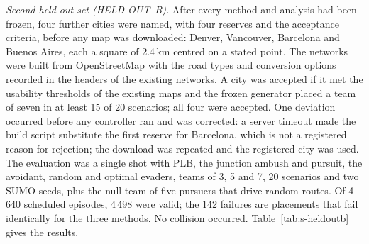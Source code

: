 \documentclass[preprint,12pt]{elsarticle}
\begin{document}
\emph{Second held-out set (HELD-OUT~B).} After every method and analysis had been frozen, four further cities were
named, with four reserves and the acceptance criteria, before any map was downloaded: Denver, Vancouver, Barcelona
and Buenos Aires, each a square of 2.4\,km centred on a stated point. The networks were built from OpenStreetMap
with the road types and conversion options recorded in the headers of the existing networks. A city was accepted if
it met the usability thresholds of the existing maps and the frozen generator placed a team of seven in at least 15
of 20 scenarios; all four were accepted. One deviation occurred before any controller ran and was corrected: a
server timeout made the build script substitute the first reserve for Barcelona, which is not a registered reason
for rejection; the download was repeated and the registered city was used. The evaluation was a single shot with
PLB, the junction ambush and pursuit, the avoidant, random and optimal evaders, teams of 3, 5 and 7, 20 scenarios
and two SUMO seeds, plus the null team of five pursuers that drive random routes. Of 4\,640 scheduled
episodes, 4\,498 were valid; the 142 failures are placements that fail identically for the three methods. No
collision occurred. Table~\ref{tab:s-heldoutb} gives the results.
\end{document}
